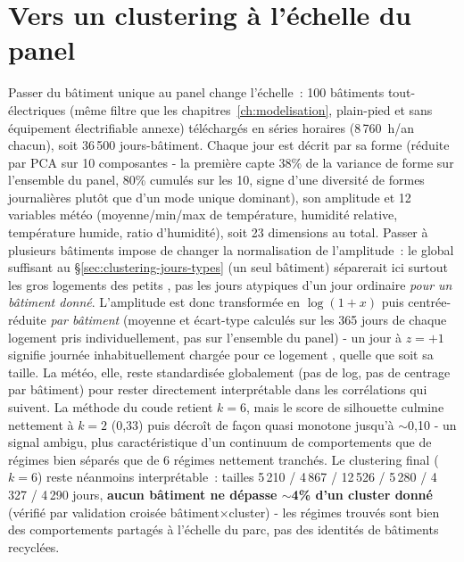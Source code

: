 \section{Vers un clustering à l'échelle du panel}
\label{sec:clustering-panel}
\begin{resultbox}
Passer du bâtiment unique au panel change l'échelle~: 100 bâtiments tout-électriques (même filtre
que les chapitres~\ref{ch:modelisation}, plain-pied et sans équipement électrifiable annexe)
téléchargés en séries horaires (8\,760~h/an chacun), soit 36\,500 jours-bâtiment. Chaque jour est
décrit par sa forme (réduite par PCA sur 10 composantes - la première capte 38\% de la variance
de forme sur l'ensemble du panel, 80\% cumulés sur les 10, signe d'une diversité de formes
journalières plutôt que d'un mode unique dominant), son amplitude et
12 variables météo (moyenne/min/max de température, humidité relative, température humide, ratio
d'humidité), soit 23 dimensions au total. Passer à plusieurs bâtiments impose de changer la
normalisation de l'amplitude~: le  global suffisant au
\S\ref{sec:clustering-jours-types} (un seul bâtiment) séparerait ici surtout les \og gros \fg{}
logements des \og petits \fg{}, pas les jours atypiques d'un jour ordinaire \emph{pour un bâtiment
donné}. L'amplitude est donc transformée en $\log(1+x)$ puis centrée-réduite \emph{par bâtiment}
(moyenne et écart-type calculés sur les 365 jours de chaque logement pris individuellement, pas sur
l'ensemble du panel) - un jour à $z=+1$ signifie \og journée inhabituellement chargée pour ce
logement \fg{}, quelle que soit sa taille. La météo, elle, reste standardisée globalement (pas de
log, pas de centrage par bâtiment) pour rester directement interprétable dans les corrélations qui
suivent. La méthode du coude retient
$k=6$, mais le score de silhouette culmine nettement à $k=2$ (0,33) puis décroît de façon quasi
monotone jusqu'à $\sim$0,10 - un signal ambigu, plus caractéristique d'un continuum de
comportements que de régimes bien séparés que de 6 régimes nettement tranchés. Le clustering final
($k=6$) reste néanmoins interprétable~: tailles 5\,210 / 4\,867 / 12\,526 / 5\,280 / 4\,327 / 4\,290
jours, \textbf{aucun bâtiment ne dépasse $\sim$4\% d'un cluster donné} (vérifié par validation
croisée bâtiment$\times$cluster) - les régimes trouvés sont bien des comportements partagés à
l'échelle du parc, pas des identités de bâtiments recyclées.
\end{resultbox}

